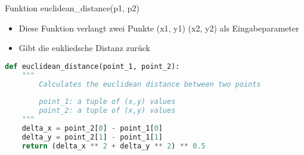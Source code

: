  \begin{frame}[fragile]{Funktion euclidean\_distance(p1, p2)}
  \begin{itemize}
    \item Diese Funktion verlangt zwei Punkte (x1, y1) (x2, y2) als Eingabeparameter
    \item Gibt die eukliedsche Distanz zurück
  \end{itemize}
  \begin{lstlisting}[language=python]
def euclidean_distance(point_1, point_2):
    """
        Calculates the euclidean distance between two points
        
        point_1: a tuple of (x,y) values
        point_2: a tuple of (x,y) values
    """
    delta_x = point_2[0] - point_1[0]
    delta_y = point_2[1] - point_1[1]
    return (delta_x ** 2 + delta_y ** 2) ** 0.5
\end{lstlisting}
\logopythonbottom
\end{frame}	